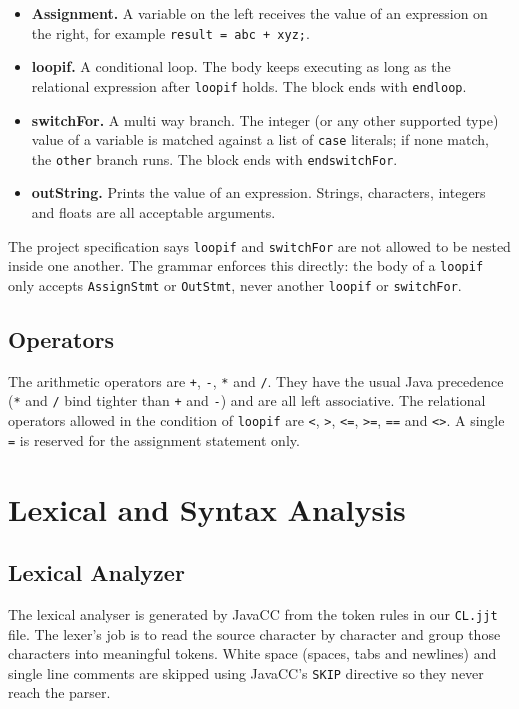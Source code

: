 \documentclass[12pt,a4paper]{report}
\begin{document}
\begin{itemize}
\item \textbf{Assignment.} A variable on the left receives the value of an expression on the right, for example \texttt{result = abc + xyz;}.
\item \textbf{loopif.} A conditional loop. The body keeps executing as long as the relational expression after \texttt{loopif} holds. The block ends with \texttt{endloop}.
\item \textbf{switchFor.} A multi way branch. The integer (or any other supported type) value of a variable is matched against a list of \texttt{case} literals; if none match, the \texttt{other} branch runs. The block ends with \texttt{endswitchFor}.
\item \textbf{outString.} Prints the value of an expression. Strings, characters, integers and floats are all acceptable arguments.
\end{itemize}

The project specification says \texttt{loopif} and \texttt{switchFor} are not allowed to be nested inside one another. The grammar enforces this directly: the body of a \texttt{loopif} only accepts \texttt{AssignStmt} or \texttt{OutStmt}, never another \texttt{loopif} or \texttt{switchFor}.

\section{Operators}

The arithmetic operators are \texttt{+}, \texttt{-}, \texttt{*} and \texttt{/}. They have the usual Java precedence (\texttt{*} and \texttt{/} bind tighter than \texttt{+} and \texttt{-}) and are all left associative. The relational operators allowed in the condition of \texttt{loopif} are \texttt{<}, \texttt{>}, \texttt{<=}, \texttt{>=}, \texttt{==} and \texttt{<>}. A single \texttt{=} is reserved for the assignment statement only.

\chapter{Lexical and Syntax Analysis}

\section{Lexical Analyzer}

The lexical analyser is generated by JavaCC from the token rules in our \texttt{CL.jjt} file. The lexer's job is to read the source character by character and group those characters into meaningful tokens. White space (spaces, tabs and newlines) and single line comments are skipped using JavaCC's \texttt{SKIP} directive so they never reach the parser.
\end{document}

